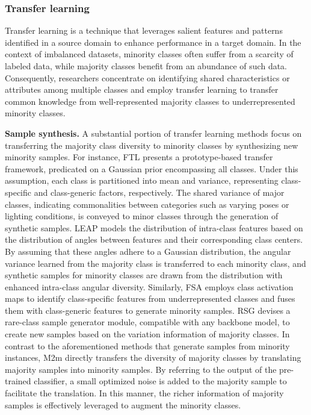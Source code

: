 \subsubsection{Transfer learning}

Transfer learning is a technique that leverages salient features and patterns identified in a source domain to enhance performance in a target domain. In the context of imbalanced datasets, minority classes often suffer from a scarcity of labeled data, while majority classes benefit from an abundance of such data. Consequently, researchers concentrate on identifying shared characteristics or attributes among multiple classes and employ transfer learning to transfer common knowledge from well-represented majority classes to underrepresented minority classes.

\textbf{Sample synthesis.}
A substantial portion of transfer learning methods focus on transferring the majority class diversity to minority classes by synthesizing new minority samples.
For instance, FTL \cite{yin2019feature} presents a prototype-based transfer framework, predicated on a Gaussian prior encompassing all classes. Under this assumption, each class is partitioned into mean and variance, representing class-specific and class-generic factors, respectively. The shared variance of major classes, indicating commonalities between categories such as varying poses or lighting conditions, is conveyed to minor classes through the generation of synthetic samples.
LEAP \cite{liu2020deep}models the distribution of intra-class features based on the distribution of angles between features and their corresponding class centers. By assuming that these angles adhere to a Gaussian distribution, the angular variance learned from the majority class is transferred to each minority class, and synthetic samples for minority classes are drawn from the distribution with enhanced intra-class angular diversity.
Similarly, FSA \cite{chu2020feature} employs class activation maps to identify class-specific features from underrepresented classes and fuses them with class-generic features to generate minority samples. RSG \cite{wang2021rsg} devises a rare-class sample generator module, compatible with any backbone model, to create new samples based on the variation information of majority classes.
In contrast to the aforementioned methods that generate samples from minority instances, M2m \cite{kim2020m2m} directly transfers the diversity of majority classes by translating majority samples into minority samples. By referring to the output of the pre-trained classifier, a small optimized noise is added to the majority sample to facilitate the translation. In this manner, the richer information of majority samples is effectively leveraged to augment the minority classes.

